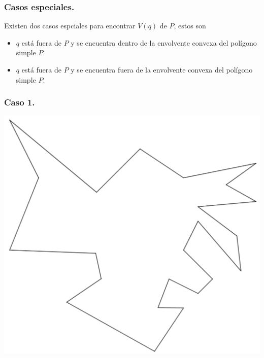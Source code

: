 \begin{frame}
  \frametitle{Casos especiales.}
  Existen dos casos espciales para encontrar $V(q)$ de $P$, estos son
  \begin{itemize}
  \item $q$ está fuera de $P$ y se encuentra dentro de la envolvente convexa del polígono simple $P$.
  \item $q$ está fuera de $P$ y se encuentra fuera de la envolvente convexa del polígono simple $P$.
  \end{itemize}
\end{frame}

\begin{frame}
  \frametitle{Caso 1.}
  \centering \includegraphics[width=0.50 \paperwidth]{images/CasosQExterno/P.png}
\end{frame}

